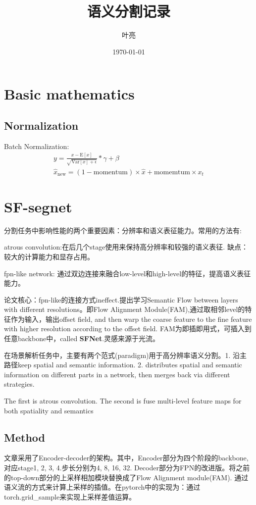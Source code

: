 \documentclass{article}
\title{语义分割记录}
\author{叶亮}
\date{\today}
\begin{document}
 
\maketitle
\tableofcontents
\section{Basic mathematics}
\subsection{Normalization}
Batch Normalization:
\begin{align}
y = \frac{x - \mathrm{E}[x]}{ \sqrt{\mathrm{Var}[x] + \epsilon}} * \gamma + \beta \\
\hat{x}_\text{new} = (1 - \text{momentum}) \times \hat{x} + \text{momemtum} \times x_t
\end{align}

\section{SF-segnet}
分割任务中影响性能的两个重要因素：分辨率和语义表征能力。常用的方法有:

atrous convolution:在后几个stage使用来保持高分辨率和较强的语义表征. 缺点：较大的计算能力和显存占用。

fpn-like network: 通过双边连接来融合low-level和high-level的特征，提高语义表征能力。

论文核心：fpn-like的连接方式ineffect.提出学习Semantic Flow between layers with different resolutions。即Flow Alignment Module(FAM),通过取相邻level的特征作为输入，输出offset field, and then warp the coarse feature to the fine feature with higher resolution according to the offset field. FAM为即插即用式，可插入到任意backbone中，called \textbf{SFNet}.灵感来源于光流。

在场景解析任务中，主要有两个范式(paradigm)用于高分辨率语义分割。1. 沿主路径keep spatial and semantic information. 2. distributes spatial and semantic information on different parts in a network, then merges back via different strategies.

The first is atrous convolution. The second is fuse multi-level feature maps for both spatiality and semantics

\subsection{Method}
文章采用了Encoder-decoder的架构。其中，Encoder部分为四个阶段的backbone,对应stage1, 2, 3, 4.步长分别为4, 8, 16, 32. Decoder部分为FPN的改进版。将之前的top-down部分的上采样相加模块替换成了Flow Alignment module(FAM). 通过语义流的方式来计算上采样的插值。在pytorch中的实现为：通过torch.grid{\_}sample来实现上采样差值运算。	
\end{document}
